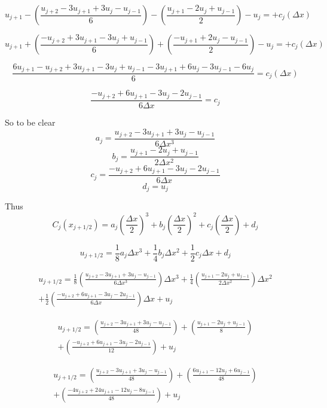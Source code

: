 \documentclass[12pt]{article}
\begin{document}
\[u_{j+1} -\left(\frac{u_{j+2} - 3u_{j+1} + 3u_j - u_{j-1}}{6}\right) -\left(\frac{u_{j+1} - 2u_j + u_{j-1}}{2 }\right) - u_j   =  + c_j (\Delta x) \]

\[u_{j+1} + \left(\frac{-u_{j+2} + 3u_{j+1} - 3u_j + u_{j-1}}{6}\right) + \left(\frac{-u_{j+1} + 2u_j - u_{j-1}}{2 }\right) - u_j   =  + c_j (\Delta x) \]

\[\frac{6u_{j+1} -u_{j+2} + 3u_{j+1} - 3u_j + u_{j-1} -3u_{j+1} + 6u_j - 3u_{j-1} - 6u_j}{6}   =  c_j (\Delta x) \]

\[\frac{ -u_{j+2} + 6u_{j+1} - 3u_j - 2u_{j-1}}{6 \Delta x}   =  c_j \]

So to be clear
\[a_j = \frac{u_{j+2} - 3u_{j+1} + 3u_j - u_{j-1}}{6 \Delta x^3} \]
\[ b_j = \frac{u_{j+1} - 2u_j + u_{j-1}}{2 \Delta x^2 } \]
\[ c_j = \frac{ -u_{j+2} + 6u_{j+1} - 3u_j - 2u_{j-1}}{6 \Delta x}  \]
\[ d_j = u_j\]

Thus
\[C_j (x_{j + 1/2}) = a_j (\frac{\Delta x}{2})^3 + b_j(\frac{\Delta x}{2})^2 + c_j (\frac{\Delta x}{2}) + d_j\]

\[u_{j + 1/2} = \frac{1}{8}a_j\Delta x^3 + \frac{1}{4}b_j\Delta x^2 + \frac{1}{2}c_j\Delta x + d_j\]

\begin{equation}
\begin{split}
u_{j + 1/2} = \frac{1}{8}\left(\frac{u_{j+2} - 3u_{j+1} + 3u_j - u_{j-1}}{6 \Delta x^3}\right)\Delta x^3 + \frac{1}{4}\left( \frac{u_{j+1} - 2u_j + u_{j-1}}{2 \Delta x^2 }\right)\Delta x^2 \\  + \frac{1}{2}\left(\frac{ -u_{j+2} + 6u_{j+1} - 3u_j - 2u_{j-1}}{6 \Delta x}  \right)\Delta x + u_j
\end{split}
\end{equation}

\begin{equation}
\begin{split}
u_{j + 1/2} = \left(\frac{u_{j+2} - 3u_{j+1} + 3u_j - u_{j-1}}{48}\right) + \left( \frac{u_{j+1} - 2u_j + u_{j-1}}{8 }\right) \\  +\left(\frac{ -u_{j+2} + 6u_{j+1} - 3u_j - 2u_{j-1}}{12} \right)+ u_j
\end{split}
\end{equation}

\begin{equation}
\begin{split}
u_{j + 1/2} = \left(\frac{u_{j+2} - 3u_{j+1} + 3u_j - u_{j-1}}{48}\right) + \left( \frac{6u_{j+1} - 12u_j + 6u_{j-1}}{48 }\right) \\  +\left(\frac{ -4u_{j+2} + 24u_{j+1} - 12u_j - 8u_{j-1} }{48} \right)+ u_j
\end{split}
\end{equation}
\end{document}
